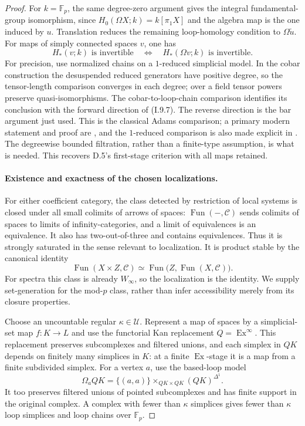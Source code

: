 \begin{proof}
For $k=\mathbb F_p$, the same degree-zero argument gives the integral fundamental-group isomorphism, since
$H_0(\Omega X;k)=k[\pi_1X]$ and the algebra map is the one induced by $u$. Translation reduces the remaining loop-homology condition to $\Omega\widetilde u$. For maps of simply connected spaces $v$, one has
\[
 H_*(v;k)\text{ is invertible}
 \quad\Longleftrightarrow\quad
 H_*(\Omega v;k)\text{ is invertible}.
 \tag{I.9.7}
\]
For precision, use normalized chains on a $1$-reduced simplicial model. In the cobar construction the desuspended reduced generators have positive degree, so the tensor-length comparison converges in each degree; over a field tensor powers preserve quasi-isomorphisms. The cobar-to-loop-chain comparison identifies its conclusion with the forward direction of (I.9.7). The reverse direction is the bar argument just used. This is the classical Adams comparison; a primary modern statement and proof are \citet[Theorem~1]{I9Rivera2022}, and the $1$-reduced comparison is also made explicit in \citet[Proposition~4 and proof of Theorem~41]{I9RWZ2022}. The degreewise bounded filtration, rather than a finite-type assumption, is what is needed. This recovers D.5's first-stage criterion with all maps retained.

\paragraph{Existence and exactness of the chosen localizations.}
For either coefficient category, the class detected by restriction of local systems is closed under all small colimits of arrows of spaces: $\operatorname{Fun}(-,\mathcal C)$ sends colimits of spaces to limits of infinity-categories, and a limit of equivalences is an equivalence. It also has two-out-of-three and contains equivalences. Thus it is strongly saturated in the sense relevant to localization. It is product stable by the canonical identity
\[
 \operatorname{Fun}(X\times Z,\mathcal C)
   \simeq\operatorname{Fun}\bigl(Z,\operatorname{Fun}(X,\mathcal C)\bigr).
\]
For spectra this class is already $W_\infty$, so the localization is the identity. We supply set-generation for the mod-$p$ class, rather than infer accessibility merely from its closure properties.

Choose an uncountable regular $\kappa\in\mathcal U$. Represent a map of spaces by a simplicial-set map $f:K\to L$ and use the functorial Kan replacement $Q=\operatorname{Ex}^{\infty}$. This replacement preserves subcomplexes and filtered unions, and each simplex in $QK$ depends on finitely many simplices in $K$: at a finite $\operatorname{Ex}$-stage it is a map from a finite subdivided simplex. For a vertex $a$, use the based-loop model
\[
 \Omega_aQK=\{(a,a)\}\times_{QK\times QK}(QK)^{\Delta^1}.
\]
It too preserves filtered unions of pointed subcomplexes and has finite support in the original complex. A complex with fewer than $\kappa$ simplices gives fewer than $\kappa$ loop simplices and loop chains over $\mathbb F_p$.


\end{proof}
